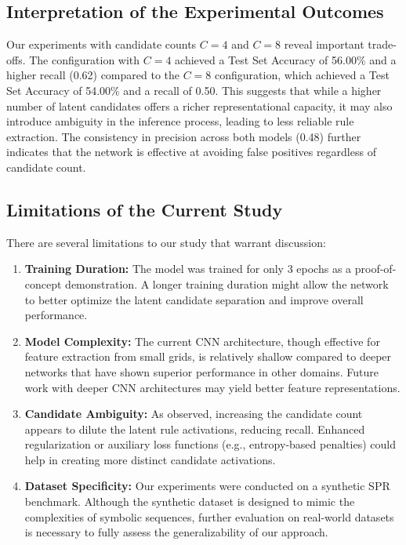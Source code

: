 \documentclass[11pt]{article}
\begin{document}
\subsection{Interpretation of the Experimental Outcomes}
Our experiments with candidate counts \(C=4\) and \(C=8\) reveal important trade-offs. The configuration with \(C=4\) achieved a Test Set Accuracy of 56.00\% and a higher recall (0.62) compared to the \(C=8\) configuration, which achieved a Test Set Accuracy of 54.00\% and a recall of 0.50. This suggests that while a higher number of latent candidates offers a richer representational capacity, it may also introduce ambiguity in the inference process, leading to less reliable rule extraction. The consistency in precision across both models (0.48) further indicates that the network is effective at avoiding false positives regardless of candidate count.

\subsection{Limitations of the Current Study}
There are several limitations to our study that warrant discussion:
\begin{enumerate}
    \item \textbf{Training Duration:} The model was trained for only 3 epochs as a proof-of-concept demonstration. A longer training duration might allow the network to better optimize the latent candidate separation and improve overall performance.
    \item \textbf{Model Complexity:} The current CNN architecture, though effective for feature extraction from small grids, is relatively shallow compared to deeper networks that have shown superior performance in other domains. Future work with deeper CNN architectures may yield better feature representations.
    \item \textbf{Candidate Ambiguity:} As observed, increasing the candidate count appears to dilute the latent rule activations, reducing recall. Enhanced regularization or auxiliary loss functions (e.g., entropy-based penalties) could help in creating more distinct candidate activations.
    \item \textbf{Dataset Specificity:} Our experiments were conducted on a synthetic SPR benchmark. Although the synthetic dataset is designed to mimic the complexities of symbolic sequences, further evaluation on real-world datasets is necessary to fully assess the generalizability of our approach.
\end{enumerate}
\end{document}
